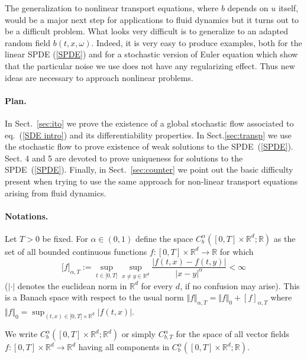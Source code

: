 \documentclass[a4paper,10pt]{article}
\begin{document}
The generalization to nonlinear transport equations, where $b$
depends on $u$ itself, would be a major next step for applications
to fluid dynamics but it turns out to be a  difficult problem.
What looks very difficult is to generalize to an adapted random
field $b(  t,x,\omega)  $. Indeed, it is very easy to
produce examples, both for the linear SPDE (\ref{SPDE}) and
for a stochastic version of Euler equation which show that the particular noise we use does not have any regularizing effect.  Thus new ideas are
necessary to approach nonlinear problems.

\paragraph{Plan.}

In Sect.~\ref{sec:ito} we prove the existence of a global
stochastic flow associated to eq.~(\ref{SDE intro}) and its
differentiability properties. In Sect.\ref{sec:transp} we use the
stochastic flow to prove existence  of weak solutions to the
SPDE~(\ref{SPDE}).  Sect. 4 and 5 are devoted to prove uniqueness
for solutions to the SPDE~(\ref{SPDE}). Finally, in
 Sect.~\ref{sec:counter} we point out the basic difficulty present when trying to
 use the same approach for non-linear transport equations arising
 from fluid dynamics.

\paragraph{Notations.}

Let $T>0$ be fixed. For ${\alpha}\in(0,1)$ define the space $C_{b}^{\alpha
}([0,T]\times{\mathbb{R}}^{d};{\mathbb{R}})$ as the set of all bounded
continuous functions $f:[0,T]\times{\mathbb{R}}^{d}\rightarrow{\mathbb{R}}$
for which
\[
\lbrack f]_{\alpha,T}:=\sup_{t\in\lbrack0,T]}\sup_{x\neq y\in{\mathbb{R}}^{d}%
}\frac{|f(t,x)-f(t,y)|}{|x-y|^{\alpha}}<\infty
\]
($|\cdot|$ denotes the euclidean norm in ${\mathbb{R}}^{d}$ for every $d$, if
no confusion may arise). This is a Banach space with respect to the usual norm
$\Vert f\Vert_{{\alpha},T}=\Vert f\Vert_{0}+[f]_{\alpha,T}$ where $\Vert
f\Vert_{0}=\sup_{(t,x)\in\lbrack0,T]\times{\mathbb{R}}^{d}}|f(t,x)|$.

We write
$C_{b}^{\alpha}([0,T]\times{\mathbb{R}}^{d};{\mathbb{R}}^{d})$ or
simply $C_{b,T}^{{\alpha}}$ for the space of all vector fields
$f:[0,T]\times {\mathbb{R}}^{d}\rightarrow{\mathbb{R}}^{d}$ having
all components in
$C_{b}^{\alpha}([0,T]\times{\mathbb{R}}^{d};{\mathbb{R}})$.
\end{document}
